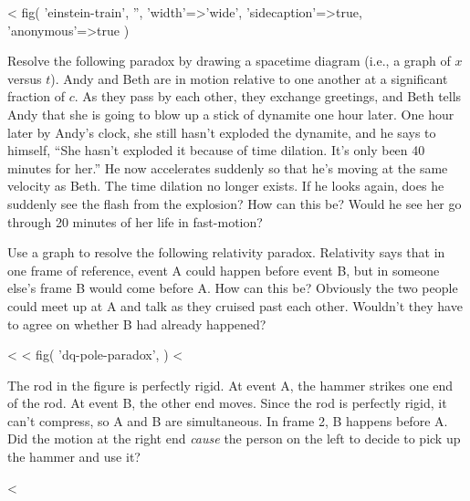 <%
 fig(
   'einstein-train',
   '',
   {
     'width'=>'wide',
     'sidecaption'=>true,
     'anonymous'=>true
   }
 )

\begin{dq}
Resolve the following paradox by drawing a spacetime diagram (i.e., a graph of $x$ versus $t$).
Andy and Beth are in motion relative to one another at a significant fraction of $c$.
As they pass by each other, they exchange greetings, and Beth tells Andy that she is
going to blow up a stick of dynamite one hour later. One hour later by Andy's clock,
she still hasn't exploded the dynamite, and he says to himself, ``She hasn't exploded it
because of time dilation. It's only been 40 minutes for her.''
He now accelerates suddenly so that he's moving at the same velocity as Beth. 
The time dilation no longer exists. If he looks again, does he suddenly see the flash from
the explosion? How can this be? Would he see her go through 20 minutes of her life in fast-motion?
\end{dq}

\begin{dq}
Use a graph to resolve the following relativity paradox.
Relativity says that in one frame of reference, event A could happen before event B, but in someone else's
frame B would come before A. How can this be? Obviously the two people could meet up at A and talk
as they cruised past each other. Wouldn't they have to
agree on whether B had already happened?
\end{dq}

<%
<%
  fig(
    'dq-pole-paradox',
  )
<%

\begin{dq}\label{dq:pole-paradox}
The rod in the figure is perfectly rigid. At event A, the hammer strikes one end of the rod.
At event B, the other end moves. Since the rod is perfectly rigid, it can't compress, so A
and B are simultaneous. In frame 2, B happens before A. Did the motion at the right end \emph{cause}
the person on the left to decide to pick up the hammer and use it?
\end{dq}


<%
